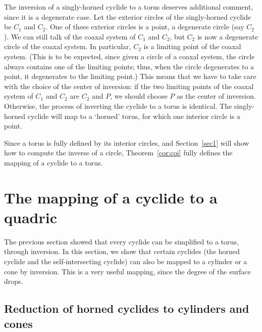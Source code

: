 \begin{rmk}
The inversion of a singly-horned cyclide to a torus deserves additional 
comment, since it is a degenerate case.
Let the exterior circles of the singly-horned cyclide be $C_1$ and $C_2$.
One of these exterior circles is a point, a degenerate circle (say $C_2$).
We can still talk of the coaxal system of $C_1$ and $C_2$,
but $C_2$ is now a degenerate circle of the coaxal system.
In particular, $C_2$ is a limiting point of the coaxal system.
(This is to be expected, since given a circle of a coaxal system,
the circle always contains one of the limiting points; thus, when 
the circle degenerates to a point, it degenerates to the limiting point.)
This means that we have to take care with the choice 
of the center of inversion: if the two limiting points of 
the coaxal system of $C_1$ and $C_2$ are $C_2$ and 
$P$, we should choose $P$ as the center of inversion.
Otherwise, the process of inverting the cyclide to a torus is identical.
The singly-horned cyclide will map to a `horned' torus, for which one
interior circle is a point.
\end{rmk}

Since a torus is fully defined by its interior circles, and Section~\ref{sec1}
will show how to compute the inverse of a circle,
Theorem~\ref{cor:coi} fully defines the mapping of a cyclide to a torus.



\section{The mapping of a cyclide to a quadric}
\label{sec:toquadric}

The previous section showed that every cyclide can be simplified 
to a torus, through inversion.
In this section, we show that certain cyclides (the horned cyclide 
and the self-intersecting cyclide) can also be mapped to a cylinder or a cone
by inversion.
This is a very useful mapping, since the degree of the surface drops.

\subsection{Reduction of horned cyclides to cylinders and cones}
\label{sec:tocyl}


